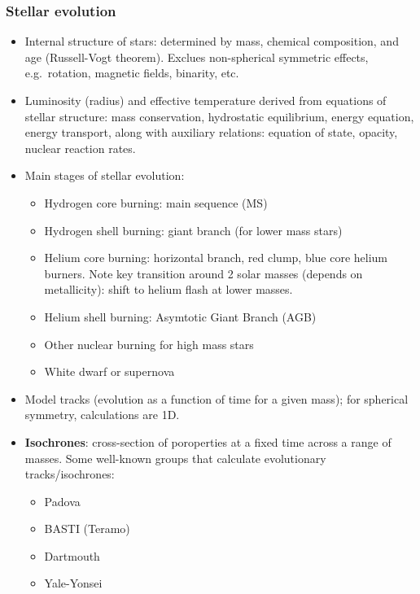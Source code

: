 \documentclass{article}
\begin{document}
\subsubsection{Stellar evolution}
\begin{itemize} %
    \item Internal structure of stars: determined by mass, chemical
        composition, and age (Russell-Vogt theorem). Exclues
        non-spherical symmetric effects, e.g.\ rotation, magnetic
        fields, binarity, etc.
    \item Luminosity (radius) and effective temperature derived from
        equations of stellar structure: mass conservation, hydrostatic
        equilibrium, energy equation, energy transport, along
        with auxiliary relations: equation of state, opacity, nuclear
        reaction rates.
    \item Main stages of stellar evolution:
        \begin{itemize} %
            \item Hydrogen core burning: main sequence (MS)
            \item Hydrogen shell burning: giant branch (for lower mass
                stars)
            \item Helium core burning: horizontal branch, red clump,
                blue core helium burners. Note key transition around 2
                solar masses (depends on metallicity): shift to helium
                flash at lower masses.
            \item Helium shell burning: Asymtotic Giant Branch (AGB)
            \item Other nuclear burning for high mass stars
            \item White dwarf or supernova
        \end{itemize} %
    \item Model tracks (evolution as a function of time for a given
      mass); for spherical symmetry, calculations are 1D.
    \item \textbf{Isochrones}: cross-section of poroperties at a
      fixed time across a range of masses. Some well-known groups that
      calculate evolutionary tracks/isochrones:
      \begin{itemize}
          \item Padova
          \item BASTI (Teramo)
          \item Dartmouth
          \item Yale-Yonsei

\end{itemize}
\end{itemize}
\end{document}
